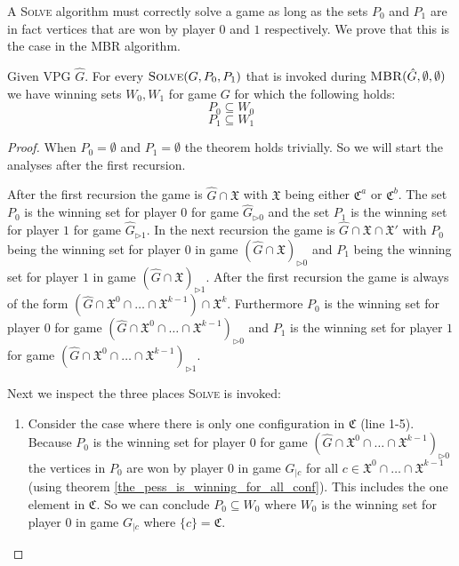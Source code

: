 A \textsc{Solve} algorithm must correctly solve a game as long as the sets $P_0$ and $P_1$ are in fact vertices that are won by player $0$ and $1$ respectively. We prove that this is the case in the \textsc{MBR} algorithm.
\begin{theorem}
Given VPG $\hat{G}$. For every $\textsc{Solve}(G,P_0,P_1)$ that is invoked during $\textsc{MBR}(\hat{G},\emptyset,\emptyset)$ we have winning sets $W_0,W_1$ for game $G$ for which the following holds:
\[ P_0 \subseteq  W_0 \]
\[ P_1 \subseteq  W_1 \]
	\begin{proof}
		When $P_0 = \emptyset$ and $P_1 = \emptyset$ the theorem holds trivially. So we will start the analyses after the first recursion. 
		
		After the first recursion the game is $\hat{G} \cap \mathfrak{X}$ with $\mathfrak{X}$ being either $\mathfrak{C}^a$ or $\mathfrak{C}^b$. The set $P_0$ is the winning set for player $0$ for game $\hat{G}_{\triangleright0}$ and the set $P_1$ is the winning set for player $1$ for game $\hat{G}_{\triangleright1}$. In the next recursion the game is $\hat{G} \cap \mathfrak{X} \cap \mathfrak{X}'$ with $P_0$ being the winning set for player $0$ in game $(\hat{G} \cap \mathfrak{X})_{\triangleright0}$ and $P_1$ being the winning set for player $1$ in game $(\hat{G} \cap \mathfrak{X})_{\triangleright1}$. After the first recursion the game is always of the form  $(\hat{G} \cap \mathfrak{X}^0 \cap \dots \cap \mathfrak{X}^{k-1}) \cap \mathfrak{X}^k$. Furthermore $P_0$ is the winning set for player $0$ for game $(\hat{G} \cap \mathfrak{X}^0 \cap \dots \cap \mathfrak{X}^{k-1})_{\triangleright0}$ and $P_1$ is the winning set for player $1$ for game $(\hat{G} \cap \mathfrak{X}^0 \cap \dots \cap \mathfrak{X}^{k-1})_{\triangleright1}$.
		
		Next we inspect the three places \textsc{Solve} is invoked:
		\begin{enumerate}
			\item Consider the case where there is only one configuration in $\mathfrak{C}$ (line 1-5). Because $P_0$ is the winning set for player $0$ for game $(\hat{G} \cap \mathfrak{X}^0 \cap \dots \cap \mathfrak{X}^{k-1})_{\triangleright0}$ the vertices in $P_0$ are won by player $0$ in game $G_{|c}$ for all $c \in \mathfrak{X}^0 \cap \dots \cap \mathfrak{X}^{k-1}$ (using theorem \ref{the_pess_is_winning_for_all_conf}). This includes the one element in $\mathfrak{C}$. So we can conclude $P_0 \subseteq W_0$ where $W_0$ is the winning set for player $0$ in game $G_{|c}$ where $\{c\} = \mathfrak{C}$.
			

\end{enumerate}
\end{proof}
\end{theorem}
